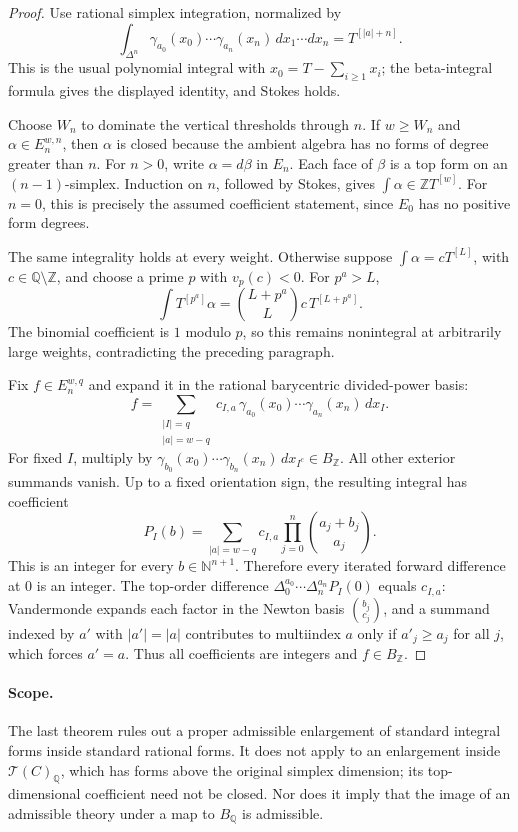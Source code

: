 \begin{proof}
Use rational simplex integration, normalized by
\[
 \int_{\Delta^n}
 \gamma_{a_0}(x_0)\cdots\gamma_{a_n}(x_n)\,
 dx_1\cdots dx_n=T^{[|a|+n]}.
\]
This is the usual polynomial integral with \(x_0=T-\sum_{i\geq1}x_i\); the beta-integral formula gives the displayed identity, and Stokes holds.

Choose \(W_n\) to dominate the vertical thresholds through \(n\). If \(w\geq W_n\) and \(\alpha\in E_n^{w,n}\), then \(\alpha\) is closed because the ambient algebra has no forms of degree greater than \(n\). For \(n>0\), write \(\alpha=d\beta\) in \(E_n\). Each face of \(\beta\) is a top form on an \((n-1)\)-simplex. Induction on \(n\), followed by Stokes, gives
\(\int\alpha\in\mathbb ZT^{[w]}\). For \(n=0\), this is precisely the assumed coefficient statement, since \(E_0\) has no positive form degrees.

The same integrality holds at every weight. Otherwise suppose
\(\int\alpha=cT^{[L]}\), with \(c\in\mathbb Q\setminus\mathbb Z\), and choose a prime \(p\) with \(v_p(c)<0\). For \(p^a>L\),
\[
 \int T^{[p^a]}\alpha
 =\binom{L+p^a}{L}c\,T^{[L+p^a]}.
\]
The binomial coefficient is \(1\) modulo \(p\), so this remains nonintegral at arbitrarily large weights, contradicting the preceding paragraph.

Fix \(f\in E_n^{w,q}\) and expand it in the rational barycentric divided-power basis:
\[
 f=\sum_{\substack{|I|=q\\|a|=w-q}}
 c_{I,a}\,\gamma_{a_0}(x_0)\cdots\gamma_{a_n}(x_n)\,dx_I .
\]
For fixed \(I\), multiply by
\(\gamma_{b_0}(x_0)\cdots\gamma_{b_n}(x_n)\,dx_{I^c}\in B_{\mathbb Z}\).
All other exterior summands vanish. Up to a fixed orientation sign, the resulting integral has coefficient
\[
 P_I(b)=\sum_{|a|=w-q}c_{I,a}
          \prod_{j=0}^n\binom{a_j+b_j}{a_j}.
\]
This is an integer for every \(b\in\mathbb N^{n+1}\). Therefore every iterated forward difference at \(0\) is an integer. The top-order difference
\(\Delta_0^{a_0}\cdots\Delta_n^{a_n}P_I(0)\) equals \(c_{I,a}\): Vandermonde expands each factor in the Newton basis \(\binom{b_j}{c_j}\), and a summand indexed by \(a'\) with \(|a'|=|a|\) contributes to multiindex \(a\) only if \(a'_j\geq a_j\) for all \(j\), which forces \(a'=a\). Thus all coefficients are integers and \(f\in B_{\mathbb Z}\).
\end{proof}

\paragraph{Scope.}
The last theorem rules out a proper admissible enlargement of standard integral forms inside standard rational forms. It does not apply to an enlargement inside \(\mathcal T(C)_{\mathbb Q}\), which has forms above the original simplex dimension; its top-dimensional coefficient need not be closed. Nor does it imply that the image of an admissible theory under a map to \(B_{\mathbb Q}\) is admissible.

